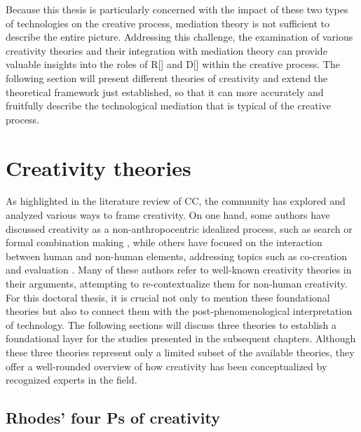 Because this thesis is particularly concerned with the impact of these two types of technologies on the creative process, mediation theory is not sufficient to describe the entire picture. Addressing this challenge, the examination of various creativity theories and their integration with mediation theory can provide valuable insights into the roles of R[] and D[] within the creative process. The following section will present different theories of creativity and extend the theoretical framework just established, so that it can more accurately and fruitfully describe the technological mediation that is typical of the creative process.
 
\section{Creativity theories}

As highlighted in the literature review of CC, the community has explored and analyzed various ways to frame creativity. On one hand, some authors have discussed creativity as a non-anthropocentric idealized process, such as search or formal combination making \citep{Wiggins2006,Hoorn2014,Besold2017}, while others have focused on the interaction between human and non-human elements, addressing topics such as co-creation and evaluation \citep{Saunders2012,Jordanous2012,Davis2016,Kantosalo2019}. Many of these authors refer to well-known creativity theories in their arguments, attempting to re-contextualize them for non-human creativity. For this doctoral thesis, it is crucial not only to mention these foundational theories but also to connect them with the post-phenomenological interpretation of technology. The following sections will discuss three theories to establish a foundational layer for the studies presented in the subsequent chapters. Although these three theories represent only a limited subset of the available theories, they offer a well-rounded overview of how creativity has been conceptualized by recognized experts in the field.

\subsection{Rhodes' four Ps of creativity}

